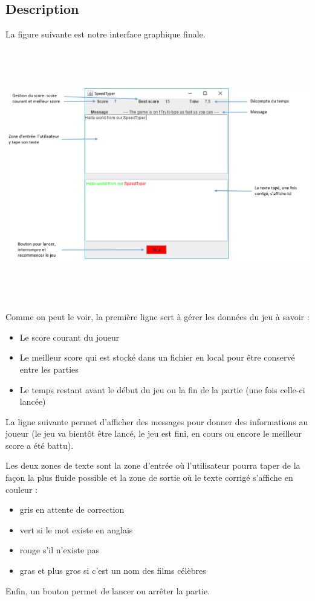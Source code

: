 \documentclass[a4paper,11pt]{article}
\begin{document}
\subsection{Description}
La figure suivante est notre interface graphique finale.\par
\begin{center}
\includegraphics[width = 17cm, height = 11cm]{interfaceGraphique.png}
\end{center}\par
Comme on peut le voir, la première ligne sert à gérer les données du jeu à savoir :
\begin{itemize}
\item Le score courant du joueur
\item Le meilleur score qui est stocké dans un fichier en local pour être conservé entre les parties
\item Le temps restant avant le début du jeu ou la fin de la partie (une fois celle-ci lancée)
\end{itemize}\par
La ligne suivante permet d'afficher des messages pour donner des informations au joueur (le jeu va bientôt être lancé, le jeu est fini, en cours ou encore le meilleur score a été battu).\par
Les deux zones de texte sont la zone d'entrée où l'utilisateur pourra taper de la façon la plus fluide possible et la zone de sortie où le texte corrigé s'affiche en couleur :
\begin{itemize}
\item gris en attente de correction
\item vert si le mot existe en anglais
\item rouge s'il n'existe pas
\item gras et plus gros si c'est un nom des films célèbres
\end{itemize}\par
Enfin, un bouton permet de lancer ou arrêter la partie.
\end{document}
